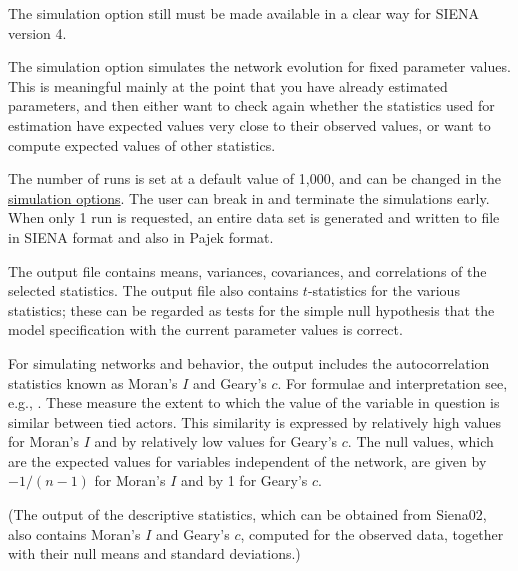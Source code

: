 \documentclass[a4paper,fleqn]{article}
\newcommand{\+}{\, + \,}
\newcommand{\SI}{{\sf SIENA }}
\begin{document}
{The simulation option still must be made available in a clear way for \SI
version 4.

The simulation option simulates the network evolution for fixed
parameter values. This is meaningful mainly at the point that you
have already estimated parameters, and then either want to check
again whether the statistics used for estimation have expected
values very close to their observed values, or want to compute
expected values of other statistics.

The number of runs is set at a default value of 1,000, and can be
changed in the \hyperlink{T_S_simoptions}{simulation options}. The
user can break in and terminate the simulations early.
When only 1 run is requested, an entire data set is generated
and written to file in \SI format and also in Pajek format.

The output file contains means, variances, covariances, and
correlations of the selected statistics. The output file also
contains $t$-statistics for the various statistics; these can be
regarded as tests for the simple null hypothesis that the model
specification with the current parameter values is correct.

For simulating networks and behavior, the output includes
the autocorrelation statistics known as Moran's $I$ and Geary's $c$.
For formulae and interpretation see, e.g., \citet[98--99]{Ripley81}.
These measure the extent to which the value of the variable
in question is similar between tied actors.
This similarity is expressed by relatively high values for Moran's $I$
and by relatively low values for Geary's $c$.
The null values, which are the expected values for variables
independent of the network, are given by $-1/(n-1)$ for Moran's $I$
and by 1 for Geary's $c$.

(The output of the descriptive statistics, which can be obtained
from \textsf{Siena02}, also contains Moran's $I$ and Geary's $c$,
computed for the observed data, together with their
null means and standard deviations.)


}
\end{document}
